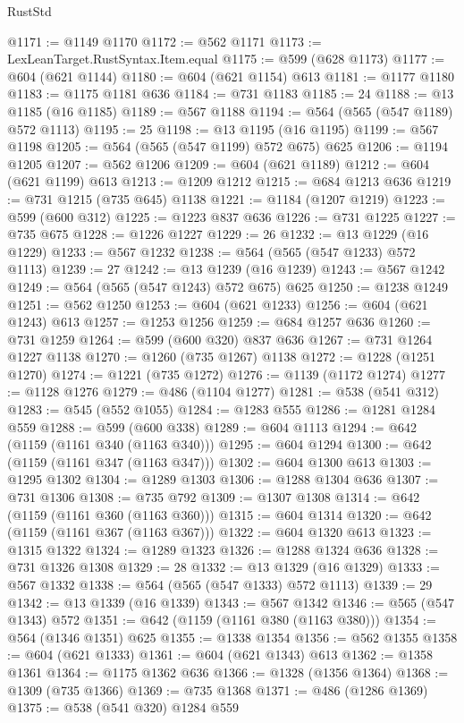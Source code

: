 \begin{lexlean}{RustStd}
\begin{coremodule}
@1171 := @1149 @1170
@1172 := @562 @1171
@1173 := LexLeanTarget.RustSyntax.Item.equal
@1175 := @599 (@628 @1173)
@1177 := @604 (@621 @1144)
@1180 := @604 (@621 @1154) @613
@1181 := @1177 @1180
@1183 := @1175 @1181 @636
@1184 := @731 @1183
@1185 := 24
@1188 := @13 @1185 (@16 @1185)
@1189 := @567 @1188
@1194 := @564 (@565 (@547 @1189) @572 @1113)
@1195 := 25
@1198 := @13 @1195 (@16 @1195)
@1199 := @567 @1198
@1205 := @564 (@565 (@547 @1199) @572 @675) @625
@1206 := @1194 @1205
@1207 := @562 @1206
@1209 := @604 (@621 @1189)
@1212 := @604 (@621 @1199) @613
@1213 := @1209 @1212
@1215 := @684 @1213 @636
@1219 := @731 @1215 (@735 @645) @1138
@1221 := @1184 (@1207 @1219)
@1223 := @599 (@600 @312)
@1225 := @1223 @837 @636
@1226 := @731 @1225
@1227 := @735 @675
@1228 := @1226 @1227
@1229 := 26
@1232 := @13 @1229 (@16 @1229)
@1233 := @567 @1232
@1238 := @564 (@565 (@547 @1233) @572 @1113)
@1239 := 27
@1242 := @13 @1239 (@16 @1239)
@1243 := @567 @1242
@1249 := @564 (@565 (@547 @1243) @572 @675) @625
@1250 := @1238 @1249
@1251 := @562 @1250
@1253 := @604 (@621 @1233)
@1256 := @604 (@621 @1243) @613
@1257 := @1253 @1256
@1259 := @684 @1257 @636
@1260 := @731 @1259
@1264 := @599 (@600 @320) @837 @636
@1267 := @731 @1264 @1227 @1138
@1270 := @1260 (@735 @1267) @1138
@1272 := @1228 (@1251 @1270)
@1274 := @1221 (@735 @1272)
@1276 := @1139 (@1172 @1274)
@1277 := @1128 @1276
@1279 := @486 (@1104 @1277)
@1281 := @538 (@541 @312)
@1283 := @545 (@552 @1055)
@1284 := @1283 @555
@1286 := @1281 @1284 @559
@1288 := @599 (@600 @338)
@1289 := @604 @1113
@1294 := @642 (@1159 (@1161 @340 (@1163 @340)))
@1295 := @604 @1294
@1300 := @642 (@1159 (@1161 @347 (@1163 @347)))
@1302 := @604 @1300 @613
@1303 := @1295 @1302
@1304 := @1289 @1303
@1306 := @1288 @1304 @636
@1307 := @731 @1306
@1308 := @735 @792
@1309 := @1307 @1308
@1314 := @642 (@1159 (@1161 @360 (@1163 @360)))
@1315 := @604 @1314
@1320 := @642 (@1159 (@1161 @367 (@1163 @367)))
@1322 := @604 @1320 @613
@1323 := @1315 @1322
@1324 := @1289 @1323
@1326 := @1288 @1324 @636
@1328 := @731 @1326 @1308
@1329 := 28
@1332 := @13 @1329 (@16 @1329)
@1333 := @567 @1332
@1338 := @564 (@565 (@547 @1333) @572 @1113)
@1339 := 29
@1342 := @13 @1339 (@16 @1339)
@1343 := @567 @1342
@1346 := @565 (@547 @1343) @572
@1351 := @642 (@1159 (@1161 @380 (@1163 @380)))
@1354 := @564 (@1346 @1351) @625
@1355 := @1338 @1354
@1356 := @562 @1355
@1358 := @604 (@621 @1333)
@1361 := @604 (@621 @1343) @613
@1362 := @1358 @1361
@1364 := @1175 @1362 @636
@1366 := @1328 (@1356 @1364)
@1368 := @1309 (@735 @1366)
@1369 := @735 @1368
@1371 := @486 (@1286 @1369)
@1375 := @538 (@541 @320) @1284 @559

\end{coremodule}
\end{lexlean}
